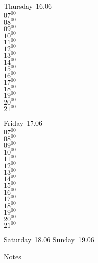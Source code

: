 \documentclass[11pt,a4paper]{book}\usepackage[]{graphicx}\usepackage[]{color}
\begin{document}
\clearpage
\begin{headerbox}
\end{headerbox}
\begin{weekdaybox}
  Thursday~16.06\\
  { 
  \vfill
  $07^{00}$\\
$08^{00}$\\
$09^{00}$\\
$10^{00}$\\
$11^{00}$\\
$12^{00}$\\
$13^{00}$\\
$14^{00}$\\
$15^{00}$\\
$16^{00}$\\
$17^{00}$\\
$18^{00}$\\
$19^{00}$\\
$20^{00}$\\
$21^{00}$\\
  }
\end{weekdaybox} 
\begin{weekdaybox}
  Friday~17.06\\
  { 
  \vfill
  $07^{00}$\\
$08^{00}$\\
$09^{00}$\\
$10^{00}$\\
$11^{00}$\\
$12^{00}$\\
$13^{00}$\\
$14^{00}$\\
$15^{00}$\\
$16^{00}$\\
$17^{00}$\\
$18^{00}$\\
$19^{00}$\\
$20^{00}$\\
$21^{00}$\\
  }
\end{weekdaybox}
\begin{weekendbox}
  Saturday~18.06
  \tcblower
  Sunday~19.06
\end{weekendbox} %
\begin{notebox}
  Notes
\end{notebox}
\clearpage
\end{document}
